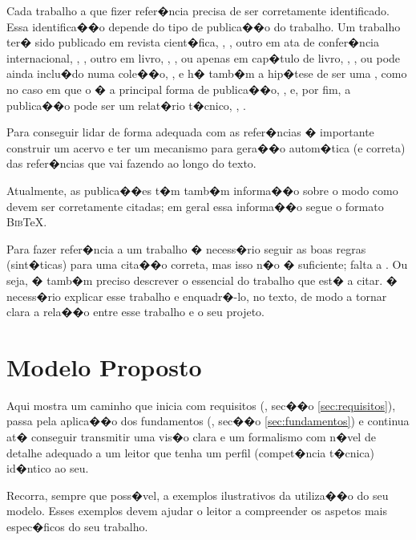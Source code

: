 Cada trabalho a que fizer refer�ncia precisa de ser corretamente identificado. Essa identifica��o depende do tipo de publica��o do trabalho. Um trabalho ter� sido publicado em revista cient�fica, \eg, \cite{Elzinga_Mills_2011}, outro em ata de confer�ncia internacional, \eg, \cite{Boutilier_et_al_1995}, outro em livro, \eg, \cite{Bellifemine_et_al_2007}, ou apenas em cap�tulo de livro, \eg, \cite{Wooldridge_2000}, ou pode ainda inclu�do numa cole��o, \eg, \cite{Howard_Matheson_1984} e h� tamb�m a hip�tese de ser uma , como no caso em que o  � a principal forma de publica��o, \eg, \cite{Python_2012} e, por fim, a publica��o pode ser um relat�rio t�cnico, \eg, \cite{Marin_2006}.

Para conseguir lidar de forma adequada com as refer�ncias � importante construir um acervo e ter um mecanismo para gera��o autom�tica (e correta) das refer�ncias que vai fazendo ao longo do texto.

Atualmente, as publica��es t�m tamb�m informa��o sobre o modo como devem ser corretamente citadas; em geral essa informa��o segue o formato \textsc{Bib}\TeX.

Para fazer refer�ncia a um trabalho � necess�rio seguir as boas regras (sint�ticas) para uma cita��o correta, mas isso n�o � suficiente; falta a . Ou seja, � tamb�m preciso descrever o essencial do trabalho que est� a citar. � necess�rio explicar esse trabalho e enquadr�-lo, no texto, de modo a tornar clara a rela��o entre esse trabalho e o seu projeto.



\chapter{Modelo Proposto}
\label{ch:modeloProposto}

Aqui mostra um caminho que inicia com requisitos (\cf, sec��o \ref{sec:requisitos}), passa pela aplica��o dos 
fundamentos (\cf, sec��o \ref{sec:fundamentos}) e continua at� conseguir transmitir uma vis�o clara e um formalismo 
com n�vel de detalhe adequado a um leitor que tenha um perfil (compet�ncia t�cnica) id�ntico ao seu.

Recorra, sempre que poss�vel, a exemplos ilustrativos da utiliza��o do seu modelo. Esses exemplos devem ajudar o leitor a 
compreender os aspetos mais espec�ficos do seu trabalho.

